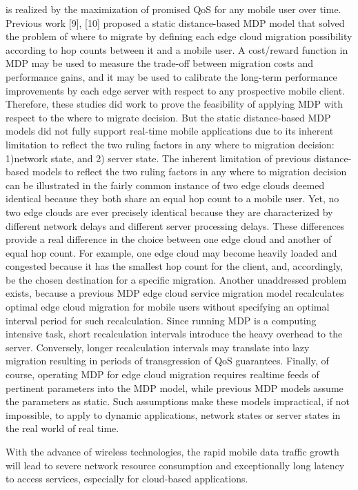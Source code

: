 is realized by the maximization of promised QoS for any
mobile user over time.
Previous work [9], [10] proposed a static distance-based
MDP model that solved the problem of where to migrate
by defining each edge cloud migration possibility according
to hop counts between it and a mobile user. A cost/reward
function in MDP may be used to measure the trade-off
between migration costs and performance gains, and it may
be used to calibrate the long-term performance improvements
by each edge server with respect to any prospective mobile
client. Therefore, these studies did work to prove the feasibility
of applying MDP with respect to the where to migrate
decision. But the static distance-based MDP models did not
fully support real-time mobile applications due to its inherent
limitation to reflect the two ruling factors in any where to
migration decision: 1)network state, and 2) server state.
The inherent limitation of previous distance-based models
to reflect the two ruling factors in any where to migration decision
can be illustrated in the fairly common instance of two
edge clouds deemed identical because they both share an equal
hop count to a mobile user. Yet, no two edge clouds are ever
precisely identical because they are characterized by different
network delays and different server processing delays. These
differences provide a real difference in the choice between
one edge cloud and another of equal hop count. For example,
one edge cloud may become heavily loaded and congested
because it has the smallest hop count for the client, and,
accordingly, be the chosen destination for a specific migration.
Another unaddressed problem exists, because a previous MDP
edge cloud service migration model recalculates optimal edge
cloud migration for mobile users without specifying an optimal
interval period for such recalculation. Since running MDP
is a computing intensive task, short recalculation intervals
introduce the heavy overhead to the server. Conversely, longer
recalculation intervals may translate into lazy migration resulting
in periods of transgression of QoS guarantees. Finally, of
course, operating MDP for edge cloud migration requires realtime
feeds of pertinent parameters into the MDP model, while
previous MDP models assume the parameters as static. Such
assumptions make these models impractical, if not impossible,
to apply to dynamic applications, network states or server
states in the real world of real time.


With the advance of wireless technologies, the rapid
mobile data traffic growth will lead to severe network resource
consumption and exceptionally long latency to access services,
especially for cloud-based applications.



